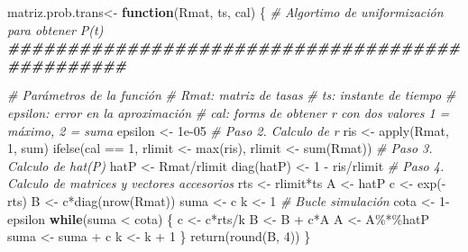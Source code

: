 \documentclass[
]{book}
\newenvironment{Shaded}{\begin{snugshade}}{\end{snugshade}}
\newcommand{\CommentTok}[1]{\textcolor[rgb]{0.56,0.35,0.01}{\textit{#1}}}
\newcommand{\ControlFlowTok}[1]{\textcolor[rgb]{0.13,0.29,0.53}{\textbf{#1}}}
\newcommand{\DecValTok}[1]{\textcolor[rgb]{0.00,0.00,0.81}{#1}}
\newcommand{\DocumentationTok}[1]{\textcolor[rgb]{0.56,0.35,0.01}{\textbf{\textit{#1}}}}
\newcommand{\FloatTok}[1]{\textcolor[rgb]{0.00,0.00,0.81}{#1}}
\newcommand{\FunctionTok}[1]{\textcolor[rgb]{0.00,0.00,0.00}{#1}}
\newcommand{\NormalTok}[1]{#1}
\newcommand{\OtherTok}[1]{\textcolor[rgb]{0.56,0.35,0.01}{#1}}
\newcommand{\SpecialCharTok}[1]{\textcolor[rgb]{0.00,0.00,0.00}{#1}}
\theoremstyle{definition}
\theoremstyle{definition}
\theoremstyle{definition}
\theoremstyle{definition}
\theoremstyle{remark}
\begin{document}
\begin{Shaded}
\begin{Highlighting}[]
\NormalTok{matriz.prob.trans}\OtherTok{\textless{}{-}} \ControlFlowTok{function}\NormalTok{(Rmat, ts, cal)}
\NormalTok{\{}
  \CommentTok{\# Algortimo de uniformización para obtener P(t)}
  \DocumentationTok{\#\#\#\#\#\#\#\#\#\#\#\#\#\#\#\#\#\#\#\#\#\#\#\#\#\#\#\#\#\#\#\#\#\#\#\#\#\#\#\#\#\#\#\#\#\#\#\#}
  
  \CommentTok{\# Parámetros de la función}
  \CommentTok{\# Rmat: matriz de tasas}
  \CommentTok{\# ts: instante de tiempo}
  \CommentTok{\# epsilon: error en la aproximación}
  \CommentTok{\# cal: forms de obtener r con dos valores 1 = máximo, 2 = suma}
\NormalTok{  epsilon }\OtherTok{\textless{}{-}} \FloatTok{1e{-}05}
  \CommentTok{\# Paso 2. Calculo de r}
\NormalTok{  ris }\OtherTok{\textless{}{-}} \FunctionTok{apply}\NormalTok{(Rmat, }\DecValTok{1}\NormalTok{, sum)}
  \FunctionTok{ifelse}\NormalTok{(cal }\SpecialCharTok{==} \DecValTok{1}\NormalTok{, rlimit }\OtherTok{\textless{}{-}} \FunctionTok{max}\NormalTok{(ris), rlimit }\OtherTok{\textless{}{-}} \FunctionTok{sum}\NormalTok{(Rmat))}
  \CommentTok{\# Paso 3. Calculo de hat(P)}
\NormalTok{  hatP }\OtherTok{\textless{}{-}}\NormalTok{ Rmat}\SpecialCharTok{/}\NormalTok{rlimit}
  \FunctionTok{diag}\NormalTok{(hatP) }\OtherTok{\textless{}{-}} \DecValTok{1} \SpecialCharTok{{-}}\NormalTok{ ris}\SpecialCharTok{/}\NormalTok{rlimit}
  \CommentTok{\# Paso 4. Calculo de matrices y vectores accesorios}
\NormalTok{  rts }\OtherTok{\textless{}{-}}\NormalTok{ rlimit}\SpecialCharTok{*}\NormalTok{ts}
\NormalTok{  A }\OtherTok{\textless{}{-}}\NormalTok{ hatP}
\NormalTok{  c }\OtherTok{\textless{}{-}} \FunctionTok{exp}\NormalTok{(}\SpecialCharTok{{-}}\NormalTok{rts)}
\NormalTok{  B }\OtherTok{\textless{}{-}}\NormalTok{ c}\SpecialCharTok{*}\FunctionTok{diag}\NormalTok{(}\FunctionTok{nrow}\NormalTok{(Rmat))}
\NormalTok{  suma }\OtherTok{\textless{}{-}}\NormalTok{ c}
\NormalTok{  k }\OtherTok{\textless{}{-}} \DecValTok{1}
  \CommentTok{\# Bucle simulación}
\NormalTok{  cota }\OtherTok{\textless{}{-}} \DecValTok{1}\SpecialCharTok{{-}}\NormalTok{ epsilon}
  \ControlFlowTok{while}\NormalTok{(suma }\SpecialCharTok{\textless{}}\NormalTok{ cota)}
\NormalTok{  \{}
\NormalTok{    c }\OtherTok{\textless{}{-}}\NormalTok{ c}\SpecialCharTok{*}\NormalTok{rts}\SpecialCharTok{/}\NormalTok{k}
\NormalTok{    B }\OtherTok{\textless{}{-}}\NormalTok{ B }\SpecialCharTok{+}\NormalTok{ c}\SpecialCharTok{*}\NormalTok{A}
\NormalTok{    A }\OtherTok{\textless{}{-}}\NormalTok{ A}\SpecialCharTok{\%*\%}\NormalTok{hatP}
\NormalTok{    suma }\OtherTok{\textless{}{-}}\NormalTok{ suma }\SpecialCharTok{+}\NormalTok{ c}
\NormalTok{    k }\OtherTok{\textless{}{-}}\NormalTok{ k }\SpecialCharTok{+} \DecValTok{1}
\NormalTok{  \}}
  \FunctionTok{return}\NormalTok{(}\FunctionTok{round}\NormalTok{(B, }\DecValTok{4}\NormalTok{))}
\NormalTok{\}}
\end{Highlighting}
\end{Shaded}
\end{document}
